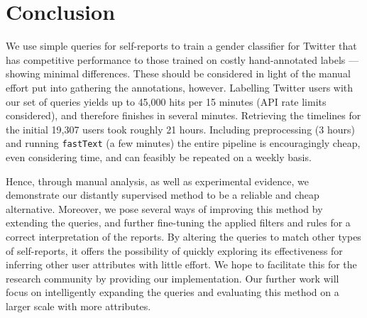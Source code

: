 \documentclass[11pt,letterpaper]{article}
\begin{document}
\section{Conclusion}

We use simple queries for self-reports to train a gender classifier for Twitter
that has competitive performance to those trained on costly hand-annotated
labels --- showing minimal differences. These should be
considered in light of the manual effort put into gathering the annotations,
however.
Labelling Twitter users with our set of queries yields up to 45,000 hits per
15 minutes (API rate limits
considered), and therefore finishes in several minutes. Retrieving the
timelines for the initial 19,307 users took roughly 21 hours. Including
preprocessing (3 hours) and running {\tt fastText} (a few minutes) the entire
pipeline is encouragingly cheap, even considering time, and can feasibly be
repeated on a weekly basis.

Hence, through manual analysis, as well as experimental evidence, we demonstrate
our distantly supervised method to be a reliable and cheap alternative.
Moreover, we pose several ways of
improving this method by extending the queries, and further fine-tuning the
applied filters and rules for a correct interpretation of the reports. By
altering the queries to match other types of self-reports, it offers
the possibility of quickly exploring its effectiveness for inferring other
user attributes with little effort. We hope to facilitate this for the research
community by providing our implementation. Our further work will focus on
intelligently expanding the queries and evaluating this method on a larger
scale with more attributes.



\end{document}
